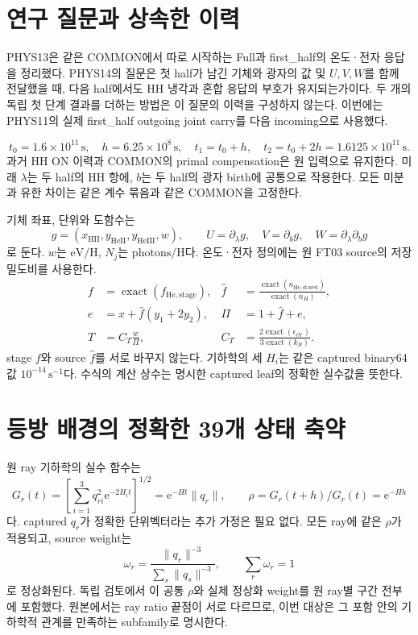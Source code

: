 \documentclass[11pt,a4paper]{article}
\newcommand{\fh}{\widehat f}
\newcommand{\ee}{\mathrm e}
\begin{document}
\section{연구 질문과 상속한 이력}
PHYS13은 같은 COMMON에서 따로 시작하는 Full과 first\_half의 온도·전자 응답을 정리했다. PHYS14의 질문은 첫 half가 남긴 기체와 광자의 값 및 $U,V,W$를 함께 전달했을 때, 다음 half에서도 HH 냉각과 혼합 응답의 부호가 유지되는가이다. 두 개의 독립 첫 단계 결과를 더하는 방법은 이 질문의 이력을 구성하지 않는다. 이번에는 PHYS11의 실제 first\_half outgoing joint carry를 다음 incoming으로 사용했다.\cite{phys11,phys13}

\begin{equation}
 t_0=1.6\times10^{11}\,\mathrm s,\quad h=6.25\times10^8\,\mathrm s,\quad
 t_1=t_0+h,\quad t_2=t_0+2h=1.6125\times10^{11}\,\mathrm s.
\end{equation}
과거 HH ON 이력과 COMMON의 primal compensation은 원 입력으로 유지한다. 미래 $\lambda$는 두 half의 HH 항에, $b$는 두 half의 광자 birth에 공통으로 작용한다. 모든 미분과 유한 차이는 같은 계수 묶음과 같은 COMMON을 고정한다.

기체 좌표, 단위와 도함수는
\begin{equation}
g=(x_{\mathrm{HII}},y_{\mathrm{HeII}},y_{\mathrm{HeIII}},w),\qquad
U=\partial_\lambda g,\quad V=\partial_b g,\quad W=\partial_\lambda\partial_b g
\end{equation}
로 둔다. $w$는 $\mathrm{eV/H}$, $N_j$는 $\mathrm{photons/H}$다. 온도·전자 정의에는 원 FT03 source의 저장 밀도비를 사용한다.
\begin{align}
 f&=\operatorname{exact}(f_{\mathrm{He,stage}}),&
 \fh&=\frac{\operatorname{exact}(n_{\mathrm{He,stored}})}{\operatorname{exact}(n_H)},\\
 e&=x+\fh(y_1+2y_2),&\Pi&=1+\fh+e,\\
 T&=C_T\frac{w}{\Pi},&C_T&=\frac{2\operatorname{exact}(\epsilon_{\mathrm{eV}})}{3\operatorname{exact}(k_B)}.
\end{align}
stage $f$와 source $\fh$를 서로 바꾸지 않는다. 기하학의 세 $H_i$는 같은 captured binary64 값 $10^{-14}\,\mathrm{s}^{-1}$다. 수식의 계산 상수는 명시한 captured leaf의 정확한 실수값을 뜻한다.\cite{ncp07,phys13}

\section{등방 배경의 정확한 39개 상태 축약}
원 ray 기하학의 실수 함수는
\begin{equation}
 G_r(t)=\left[\sum_{i=1}^3 q_{ri}^2\ee^{-2H_i t}\right]^{1/2}
 =\ee^{-Ht}\|q_r\|,\qquad \rho=G_r(t+h)/G_r(t)=\ee^{-Hh}
\end{equation}
다. captured $q_r$가 정확한 단위벡터라는 추가 가정은 필요 없다. 모든 ray에 같은 $\rho$가 적용되고, source weight는
\begin{equation}
 \omega_r=\frac{\|q_r\|^{-3}}{\sum_s\|q_s\|^{-3}},\qquad \sum_r\omega_r=1
\end{equation}
로 정상화된다. 독립 검토에서 이 공통 $\rho$와 실제 정상화 weight를 원 ray별 구간 전부에 포함했다. 원본에서는 ray ratio 끝점이 서로 다르므로, 이번 대상은 그 포함 안의 기하학적 관계를 만족하는 subfamily로 명시한다.\cite{geometry}
\end{document}
